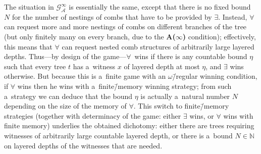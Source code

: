\documentclass[11pt,a4paper]{amsart}
\theoremstyle{plain}
\theoremstyle{definition}
\theoremstyle{defC}
\theoremstyle{thmC}
\theoremstyle{plain}
\numberwithin{equation}{section}
\numberwithin{equation}{section}
\numberwithin{figure}{section}
\newcommand{\domain}[1]{\ensuremath{\mathbb{#1}}\xspace}
\newcommand{\N}{\domain{N}}
\newcommand{\mathcalsym}[1]{\ensuremath{\mathcal{#1}}\xspace}
\newcommand{\CA}{\mathcalsym{A}}
\newcommand{\CG}{\mathcalsym{G}}
\newcommand{\eve}{\ensuremath{\exists}\xspace}
\newcommand{\adam}{\ensuremath{\forall}\xspace}
\newcommand{\itemfont}[1]{\textbf{#1}}
\begin{document}
The situation in $\CG^\infty_\CA$ is essentially the same, except that there is no fixed bound $N$ for the number of nestings of combs that have to be provided by \eve.
Instead, \adam can request more and more nestings of combs on different branches of the tree (but only finitely many on every branch, due to the \itemfont{A($\infty$)} condition);
effectively, this means that \adam can request nested comb structures of arbitrarily large layered depths.
Thus---by design of the game---\adam~wins if there is any countable bound $\eta$ such that every tree $t$ has a~witness $x$ of layered depth at most $\eta$, and \eve wins otherwise.
But because this is a~finite game with an $\omega$\=/regular winning condition, if \adam wins then he wins with a~finite\=/memory winning strategy;
from such a~strategy we can deduce that the bound $\eta$ is actually a~natural number $N$ depending on the size of the memory of $\adam$.
This switch to finite\=/memory strategies (together with determinacy of the game: either \eve wins, or \adam wins with finite memory) underlies the obtained dichotomy:
either there are trees requiring witnesses of arbitrarily large countable layered depth, or there is a~bound $N\in\N$ on layered depths of the witnesses that are needed.
\end{document}
